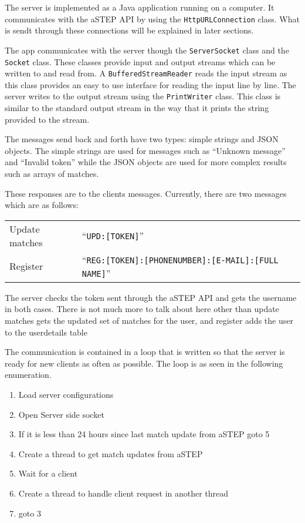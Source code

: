 The server is implemented as a Java application running on a computer.
It communicates with the aSTEP API by using the \texttt{HttpURLConnection} class.
What is sendt through these connections will be explained in later sections.

The app communicates with the server though the \texttt{ServerSocket} class and the \texttt{Socket} class.
These classes provide input and output streams which can be written to and read from.
A \texttt{BufferedStreamReader} reads the input stream as this class provides an easy to use interface for reading the input line by line.
The server writes to the output stream using the \texttt{PrintWriter} class.
This class is similar to the standard output stream in the way that it prints the string provided to the stream.

The messages send back and forth have two types: simple strings and JSON objects.
The simple strings are used for messages such as \enquote{Unknown message} and \enquote{Invalid token} while the JSON objects are used for more complex results such as arrays of matches.

These responses are to the clients messages.
Currently, there are two messages which are as follows:

{\centering
	\begin{tabular}{l l}
		Update matches & \enquote{\texttt{UPD:[TOKEN]}}\\
		Register & \enquote{\texttt{REG:[TOKEN]:[PHONENUMBER]:[E-MAIL]:[FULL NAME]}}
	\end{tabular}
}

The server checks the token sent through the aSTEP API and gets the username in both cases.
There is not much more to talk about here other than update matches gets the updated set of matches for the user, and register adds the user to the userdetails table

The communication is contained in a loop that is written so that the server is ready for new clients as often as possible.
The loop is as seen in the following enumeration.

\begin{enumerate}
	\item Load server configurations
	\item Open Server side socket
	\item If it is less than 24 hours since last match update from aSTEP goto 5
	\item Create a thread to get match updates from aSTEP
	\item Wait for a client
	\item Create a thread to handle client request in another thread
	\item goto 3
\end{enumerate}

